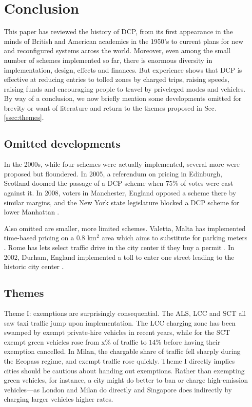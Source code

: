 \section{Conclusion}\label{sec:conclusion}

This paper has reviewed the history of DCP, from its first appearance in the minds of British and American academics in the 1950's to current plans for new and reconfigured systems across the world. Moreover, even among the small number of schemes implemented so far, there is enormous diversity in implementation, design, effects and finances. But experience shows that DCP is effective at reducing entries to tolled zones by charged  trips, raising speeds, raising funds and encouraging people to travel by priveleged modes and vehicles. By way of a conclusion, we now briefly mention some developments omitted for brevity or want of literature and return to the themes proposed in Sec. \ref{ssec:themes}.

\subsection{Omitted developments}

In the 2000s, while four schemes were actually implemented, several more were proposed but floundered. In 2005, a referendum on pricing in Edinburgh, Scotland doomed the passage of a DCP scheme when 75\% of votes were cast against it. In 2008, voters in Manchester, England opposed a scheme there by similar margins, and the New York state legislature blocked a DCP scheme for lower Manhattan \citep{Schaller2010}.

Also omitted are smaller, more limited schemes. Valetta, Malta has implemented time-based pricing on a 0.8 km$^2$ area which aims to substitute for parking meters \citep{Attard2010,Attard2015a}. Rome has lets select traffic drive in the city center if they buy a permit \citep[p. 302]{Santos2006a}. In 2002, Durham, England implemented a toll to enter one street leading to the historic city center \citep[pp. 269-270]{Santos2006a}.


\subsection{Themes}

Theme I: exemptions are surprisingly consequential. The ALS, LCC and SCT all saw taxi traffic jump upon implementation. The LCC charging zone has been swamped by exempt private-hire vehicles in recent years, while for the SCT exempt green vehicles rose from x\% of traffic to 14\% before having their exemption cancelled. In Milan, the chargable share of traffic fell sharply during the Ecopass regime, and exempt traffic rose quickly. Theme I directly implies cities should be cautious about handing out exemptions. Rather than exempting green vehicles, for instance, a city might do better to ban or charge high-emission vehicles---as London and Milan do directly and Singapore does indirectly by charging larger vehicles higher rates.

